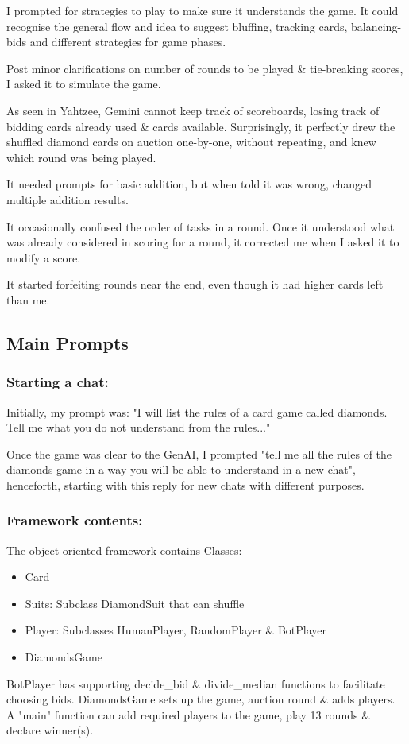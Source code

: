 \documentclass[runningheads]{llncs}
\begin{document}
I prompted for strategies to play to make sure it understands the game. It could recognise the general flow and idea to suggest bluffing, tracking cards, balancing-bids and different strategies for game phases.

Post minor clarifications on number of rounds to be played\cite{ref_rounds_played} \& tie-breaking scores, I asked it to simulate the game\cite{ref_simulate}.

As seen in Yahtzee\cite{ref_yahtzee_link}, Gemini cannot keep track of scoreboards, losing track of bidding cards already used \cite{ref_forgets_cards}\& cards available. Surprisingly, it perfectly drew the shuffled diamond cards on auction one-by-one, without repeating, and knew which round was being played.

It needed prompts for basic addition\cite{ref_addition}, but when told it was wrong, changed multiple addition results. 

It occasionally confused the order of tasks in a round. Once it understood what was already considered in scoring for a round, it corrected me when I asked it to modify a score\cite{ref_score_mess}. 

It started forfeiting rounds near the end, even though it had higher cards left than me. 

% 
\subsection{Main Prompts}
\subsubsection{Starting a chat:} Initially, my prompt was: "I will list the rules of a card game called diamonds. Tell me what you do not understand from the rules...\cite{ref_init_rules}"

Once the game was clear to the GenAI, I prompted "tell me all the rules of the diamonds game in a way you will be able to understand in a new chat", henceforth, starting with this reply\cite{ref_rules_genai} for new chats with different purposes.

\subsubsection{Framework contents:} The object oriented framework\cite{ref_colab_link} contains Classes:
\begin{itemize}
    \item Card 
    \item Suits: Subclass DiamondSuit that can shuffle
    \item Player: Subclasses HumanPlayer, RandomPlayer \& BotPlayer
    \item DiamondsGame
\end{itemize}
BotPlayer has supporting decide\_bid \& divide\_median functions to facilitate choosing bids.
DiamondsGame sets up the game, auction round \& adds players.
A "main" function can add required players to the game, play 13 rounds \& declare winner(s).
\end{document}

